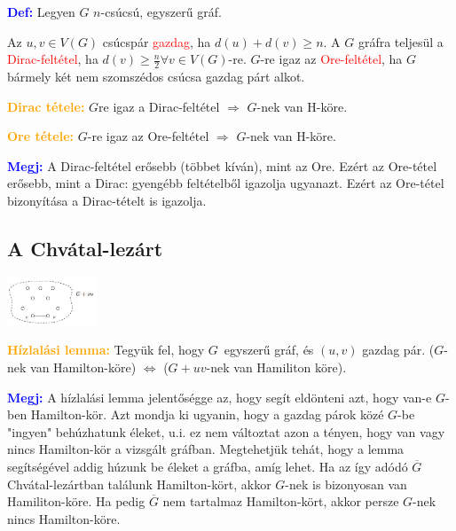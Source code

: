 \documentclass[../szamtud.tex]{subfiles}
\begin{document}
        \textcolor{blue}{\textbf{Def:}} Legyen $G$ $n$-csúcsú, egyszerű gráf.

        Az $u,v \in V(G)$ csúcspár \textcolor{red}{gazdag}, ha $d(u) + d(v) \geq n$. A $G$ gráfra teljesül a \textcolor{red}{Dirac-feltétel}, ha $d(v) \geq \frac{n}{2} \forall v \in V(G)$-re. $G$-re igaz az \textcolor{red}{Ore-feltétel}, ha $G$ bármely két nem szomszédos csúcsa gazdag párt alkot.

        \textcolor{orange}{\textbf{Dirac tétele:}} $G$re igaz a Dirac-feltétel $\Rightarrow$ $G$-nek van H-köre.

        \textcolor{orange}{\textbf{Ore tétele:}} $G$-re igaz az Ore-feltétel $\Rightarrow$ $G$-nek van H-köre.

        \textcolor{blue}{\textbf{Megj:}} A Dirac-feltétel erősebb (többet kíván), mint az Ore. Ezért az Ore-tétel erősebb, mint a Dirac: gyengébb feltételből igazolja ugyanazt. Ezért az Ore-tétel bizonyítása a Dirac-tételt is igazolja.

   \subsection{A Chvátal-lezárt} 

        \includegraphics[width=0.2\textwidth]{./img/7.png}

        \textcolor{orange}{\textbf{Hízlalási lemma:}} Tegyük fel, hogy $G$ egyszerű gráf, és $(u,v)$ gazdag pár. ($G$-nek van Hamilton-köre) $\Longleftrightarrow$ ($G + uv$-nek van Hamiliton köre).

        \textcolor{blue}{\textbf{Megj:}} A hízlalási lemma jelentőségge az, hogy segít eldönteni azt, hogy van-e $G$-ben Hamilton-kör. Azt mondja ki ugyanin, hogy a gazdag párok közé $G$-be "ingyen" behúzhatunk éleket, u.i. ez nem változtat azon a tényen, hogy van vagy nincs Hamilton-kör a vizsgált gráfban. Megtehetjük tehát, hogy a lemma segítségével addig húzunk be éleket a gráfba, amíg lehet. Ha az így adódó $\overline{G}$ Chvátal-lezártban találunk Hamilton-kört, akkor $G$-nek is bizonyosan van Hamiliton-köre. Ha pedig $\overline{G}$ nem tartalmaz Hamilton-kört, akkor persze $G$-nek nincs Hamilton-köre.

\end{document}
